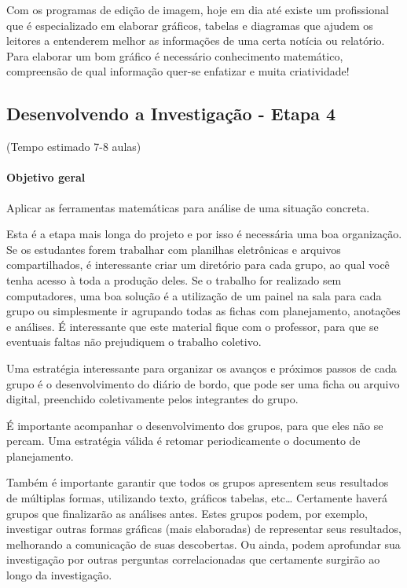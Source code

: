 Com os programas de edição de imagem, hoje em dia até existe um profissional que é especializado em elaborar gráficos, tabelas e diagramas que ajudem os leitores a entenderem melhor as informações de uma certa notícia ou relatório. Para elaborar um bom gráfico é necessário conhecimento matemático, compreensão de qual informação quer-se enfatizar e muita criatividade!
\clearmargin
\def\currentcolor{session2}
\begin{texto}
{\small
\subsection{Desenvolvendo a Investigação - Etapa 4}
(Tempo estimado 7-8 aulas)

\paragraph{Objetivo geral}
Aplicar as ferramentas matemáticas para análise de uma situação concreta.

Esta é a etapa mais longa do projeto e por isso é necessária uma boa organização. Se os estudantes forem trabalhar com planilhas eletrônicas e arquivos compartilhados, é interessante criar um diretório para cada grupo, ao qual você tenha acesso à toda a produção deles. Se o trabalho for realizado sem computadores, uma boa solução é a utilização de um painel na sala para cada grupo ou simplesmente ir agrupando todas as fichas com planejamento, anotações e análises. É interessante que este material fique com o professor, para que se eventuais faltas não prejudiquem o trabalho coletivo. 

Uma estratégia interessante para organizar os avanços e próximos passos de cada grupo é o desenvolvimento do diário de bordo, que pode ser uma ficha ou arquivo digital, preenchido coletivamente pelos integrantes do grupo. 

É importante acompanhar o desenvolvimento dos grupos, para que eles não se percam. Uma estratégia válida é retomar periodicamente o documento de planejamento.

Também é importante garantir que todos os grupos apresentem seus resultados de múltiplas formas, utilizando texto, gráficos tabelas, etc… Certamente haverá grupos que finalizarão as análises antes. Estes grupos podem, por exemplo, investigar outras formas gráficas (mais elaboradas) de representar seus resultados, melhorando a comunicação de suas descobertas. Ou ainda, podem aprofundar sua investigação por outras perguntas correlacionadas que certamente surgirão ao longo da investigação. 

}
\end{texto}
